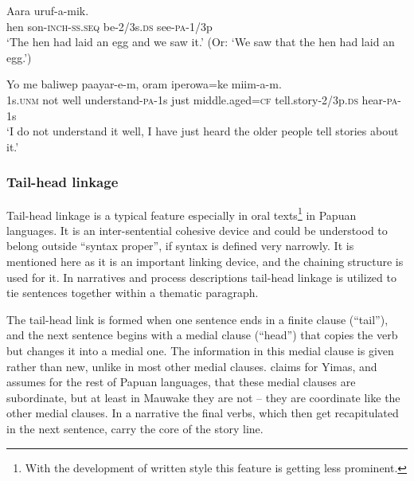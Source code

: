 \ea%
\label{ex:x1510}
\gll Aara    uruf-a-mik.\\
hen  son-\textsc{inch}-\textsc{ss}.\textsc{seq} be-2/3s.\textsc{ds} see-\textsc{pa}-1/3p\\
\glt`The hen had laid an egg and we saw it.' (Or: `We saw that the hen had laid an egg.')
\z


\ea%
\label{ex:x1511}
\gll Yo  me  baliwep  paayar-e-m,  oram  iperowa=ke \textstyleEmphasizedVernacularWords{-}  miim-a-m.\\
1s.\textsc{unm} not  well  understand-\textsc{pa}-1s  just  middle.aged=\textsc{cf} tell.story-2/3p.\textsc{ds} hear-\textsc{pa}-1s     \\
\glt`I do not understand it well, I have just heard the older people tell stories about it.'
\z


\subsubsection[Tail-head linkage]{Tail-head linkage}

Tail-head linkage is a typical feature especially in oral texts\footnote{With the development of written style this feature is getting less prominent.}  in Papuan languages. It is an inter-sentential cohesive device and could be understood to belong outside ``syntax proper'', if syntax is defined very narrowly. It is mentioned here as it is an important linking device, and the chaining structure is used for it. In narratives and process descriptions tail-head linkage is utilized to tie sentences together within a thematic paragraph. 

 The tail-head link is formed when one sentence ends in a finite clause (``tail''), and the next sentence begins with a medial clause (``head'') that copies the verb but changes it into a medial one. The information in this medial clause is given rather than new, unlike in most other medial clauses. \citet[200--201]{Foley1986} claims for Yimas, and assumes for the rest of Papuan languages, that these medial clauses are subordinate, but at least in Mauwake they are not -- they are coordinate like the other medial clauses. In a narrative the final verbs, which then get recapitulated in the next sentence, carry the core of the story line.

